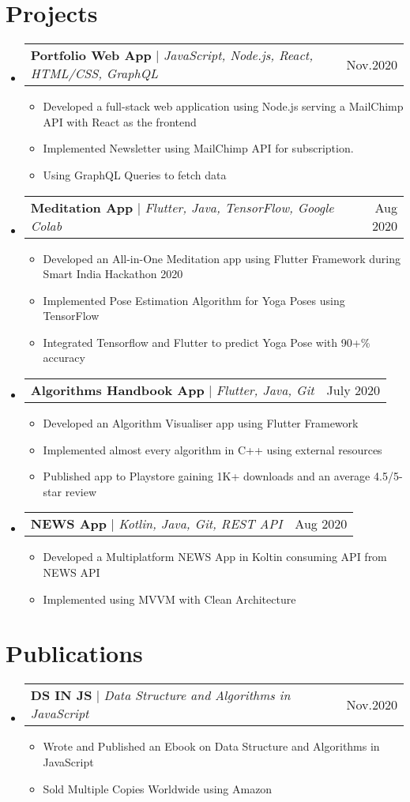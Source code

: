\documentclass[letterpaper,11pt]{article}
\makeatletter
\newcommand{\resumeItem}[1]{
  \item\small{
    {#1 \vspace{-2pt}}
  }
}
\newcommand{\resumeProjectHeading}[2]{
    \item
    \begin{tabular*}{0.97\textwidth}{l@{\extracolsep{\fill}}r}
      \small#1 & #2 \\
    \end{tabular*}\vspace{-7pt}
}
\newcommand{\resumeSubHeadingListStart}{\begin{itemize}[leftmargin=0.15in, label={}]}
\newcommand{\resumeSubHeadingListEnd}{\end{itemize}}
\newcommand{\resumeItemListStart}{\begin{itemize}}
\newcommand{\resumeItemListEnd}{\end{itemize}\vspace{-5pt}}
\makeatother
\begin{document}
\section{Projects}
    \resumeSubHeadingListStart
      \resumeProjectHeading
          {\textbf{Portfolio Web App} $|$ \emph{JavaScript, Node.js, React, HTML/CSS, GraphQL}}{Nov.2020}
          \resumeItemListStart
            \resumeItem{Developed a full-stack web application using Node.js serving a MailChimp API with React as the frontend}
            \resumeItem{Implemented Newsletter using MailChimp API for subscription.}
            \resumeItem{Using GraphQL Queries to fetch data}
          \resumeItemListEnd
     \resumeProjectHeading
          {\textbf{Meditation App} $|$ \emph{Flutter, Java, TensorFlow, Google Colab}}{Aug 2020}
          \resumeItemListStart
            \resumeItem{Developed an All-in-One Meditation app using Flutter Framework during Smart India Hackathon 2020}
            \resumeItem{Implemented Pose Estimation Algorithm for Yoga Poses using TensorFlow}
            \resumeItem{Integrated Tensorflow and Flutter to predict Yoga Pose with 90+\% accuracy}
          \resumeItemListEnd
      \resumeProjectHeading
          {\textbf{Algorithms Handbook App} $|$ \emph{Flutter, Java, Git}}{July 2020}
          \resumeItemListStart
            \resumeItem{Developed an Algorithm Visualiser app using Flutter Framework}
            \resumeItem{Implemented almost every algorithm in C++ using external resources }
            \resumeItem{Published app to Playstore gaining 1K+ downloads and an average 4.5/5-star review}
          \resumeItemListEnd
     \resumeProjectHeading
          {\textbf{NEWS App} $|$ \emph{Kotlin, Java, Git, REST API}}{Aug 2020}
          \resumeItemListStart
            \resumeItem{Developed a Multiplatform NEWS App in Koltin consuming API from NEWS API}
            \resumeItem{Implemented using MVVM with Clean Architecture}
          \resumeItemListEnd
    \resumeSubHeadingListEnd

\section{Publications}
    \resumeSubHeadingListStart
      \resumeProjectHeading
          {\textbf{DS IN JS} $|$ \emph{Data Structure and Algorithms in JavaScript}}{Nov.2020}
          \resumeItemListStart
            \resumeItem{Wrote and Published an Ebook on Data Structure and Algorithms in JavaScript}
            \resumeItem{Sold Multiple Copies Worldwide using Amazon}
          \resumeItemListEnd
            \resumeSubHeadingListEnd
\end{document}

